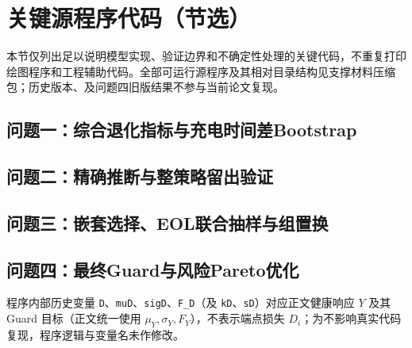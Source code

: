 \documentclass[withoutpreface]{cumcmthesis}
\begin{document}
\clearpage
\section{关键源程序代码（节选）}
本节仅列出足以说明模型实现、验证边界和不确定性处理的关键代码，不重复打印绘图程序和工程辅助代码。全部可运行源程序及其相对目录结构见支撑材料压缩包；历史版本、及问题四旧版结果不参与当前论文复现。

\subsection{问题一：综合退化指标与充电时间差Bootstrap}



\subsection{问题二：精确推断与整策略留出验证}



\subsection{问题三：嵌套选择、EOL联合抽样与组置换}




\subsection{问题四：最终Guard与风险Pareto优化}
程序内部历史变量 \texttt{D}、\texttt{muD}、\texttt{sigD}、\texttt{F\_D}（及 \texttt{kD}、\texttt{sD}）对应正文健康响应 $Y$ 及其 Guard 目标（正文统一使用 $\mu_Y,\sigma_Y,F_Y$），不表示端点损失 $D_i$；为不影响真实代码复现，程序逻辑与变量名未作修改。


\end{document}
